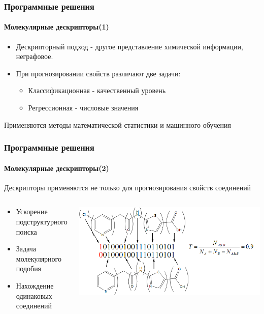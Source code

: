 \begin{frame}
  \frametitle{Программные решения}
  \framesubtitle{Молекулярные дескрипторы(1)}
  \begin{itemize}
    \item Дескрипторный подход - другое представление химической информации, неграфовое. 
    \item При прогнозировании свойств
  различают две задачи:
  \begin{itemize}
    \item Классификационная - качественный уровень
    \item Регрессионная - числовые значения
  \end{itemize}
  \end{itemize}
  Применяются методы математической статистики и машинного обучения 
\end{frame}

\begin{frame}
   \frametitle{Программные решения}
   \framesubtitle{Молекулярные дескрипторы(2)}
   Дескрипторы применяются не только для прогнозирования свойств соединений   
   \begin{columns}
     \begin{column}{0.4\textwidth}
       \begin{itemize}
         \item Ускорение подструктурного поиска
         \item Задача молекулярного подобия
         \item Нахождение одинаковых соединений
       \end{itemize}
     \end{column}
     \begin{column}{0.6\textwidth}
   \begin{center}
    \includegraphics[scale=0.4]{images/similarity.png}
   \end{center}
   \end{column}
   \end{columns}
\end{frame}

